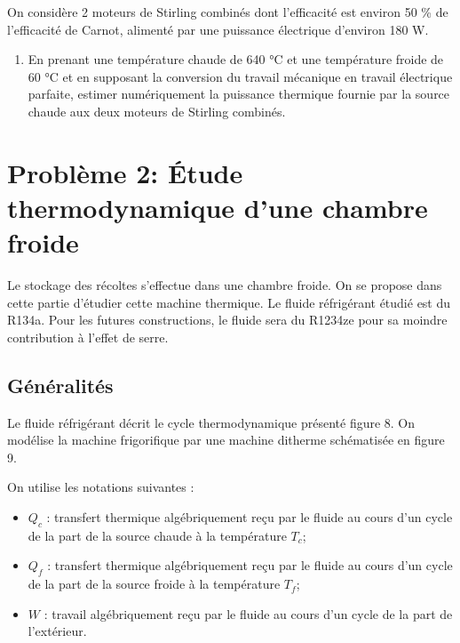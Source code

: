 \documentclass[
  10pt,
  french,
  a4paper,
  DIV=18]{scrartcl}
\providecommand{\tightlist}{%
  \setlength{\itemsep}{0pt}\setlength{\parskip}{0pt}}
\begin{document}
On considère 2 moteurs de Stirling combinés dont l'efficacité est
environ 50 \% de l'efficacité de Carnot, alimenté par une puissance
électrique d'environ 180 W.

\begin{enumerate}
\def\labelenumi{\arabic{enumi}.}
\setcounter{enumi}{9}
\tightlist
\item
  En prenant une température chaude de 640 °C et une température froide
  de 60 °C et en supposant la conversion du travail mécanique en travail
  électrique parfaite, estimer numériquement la puissance thermique
  fournie par la source chaude aux deux moteurs de Stirling combinés.
\end{enumerate}

\section*{Problème 2: Étude thermodynamique d'une chambre
froide}\label{probluxe8me-2-uxe9tude-thermodynamique-dune-chambre-froide}

Le stockage des récoltes s'effectue dans une chambre froide. On se
propose dans cette partie d'étudier cette machine thermique. Le fluide
réfrigérant étudié est du R134a. Pour les futures constructions, le
fluide sera du R1234ze pour sa moindre contribution à l'effet de serre.

\subsection*{Généralités}\label{guxe9nuxe9ralituxe9s}

Le fluide réfrigérant décrit le cycle thermodynamique présenté figure 8.
On modélise la machine frigorifique par une machine ditherme schématisée
en figure 9.

On utilise les notations suivantes :

\begin{itemize}
\tightlist
\item
  \(Q_c\) : transfert thermique algébriquement reçu par le fluide au
  cours d'un cycle de la part de la source chaude à la température
  \(T_c\);
\item
  \(Q_f\) : transfert thermique algébriquement reçu par le fluide au
  cours d'un cycle de la part de la source froide à la température
  \(T_f\);
\item
  \(W\) : travail algébriquement reçu par le fluide au cours d'un cycle
  de la part de l'extérieur.
\end{itemize}
\end{document}
